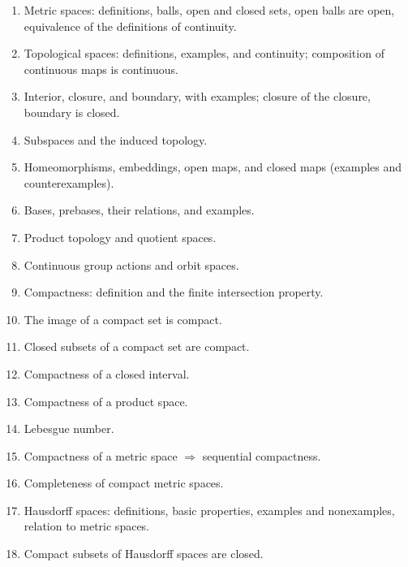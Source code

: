 \begin{enumerate}
\item Metric spaces: definitions, balls, open and closed sets, open balls are open, equivalence of the definitions of continuity.

\item Topological spaces: definitions, examples, and continuity; composition of continuous maps is continuous.

\item Interior, closure, and boundary, with examples; closure of the closure, boundary is closed.

\item Subspaces and the induced topology.

\item Homeomorphisms, embeddings, open maps, and closed maps (examples and counterexamples).

\item Bases, prebases, their relations, and examples.

\item Product topology and quotient spaces.

\item Continuous group actions and orbit spaces.

\item Compactness: definition and the finite intersection property.

\item The image of a compact set is compact.

\item Closed subsets of a compact set are compact.

\item Compactness of a closed interval.

\item Compactness of a product space.

\item Lebesgue number.

\item Compactness of a metric space $\Rightarrow$ sequential compactness.

\item Completeness of compact metric spaces.

\item Hausdorff spaces: definitions, basic properties, examples and nonexamples, relation to metric spaces.

\item Compact subsets of Hausdorff spaces are closed.


\end{enumerate}
